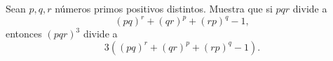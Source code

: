 Sean $p, q, r$ números primos positivos distintos. Muestra que si $pqr$ divide a
\[(pq)^r+(qr)^p+(rp)^q-1,\]
entonces $(pqr)^3$ divide a
\[3((pq)^r+(qr)^p+(rp)^q-1).\]